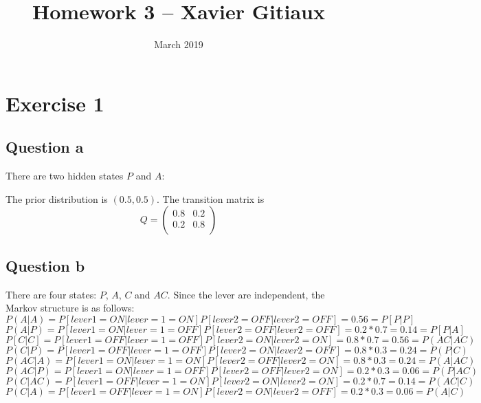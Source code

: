 \documentclass{article}
\title{Homework 3 -- Xavier Gitiaux}
\author{}
\date{March 2019}
\begin{document}
\maketitle

\section{Exercise 1}

\subsection{Question a}
There are two hidden states $P$ and $A$:

\begin{center}
\end{center}

The prior distribution is $(0.5, 0.5)$. The transition matrix is
\begin{equation}
Q= \begin{pmatrix}
0.8 & 0.2 \\
0.2 & 0.8 \\
\end{pmatrix}
\end{equation}

\subsection{Question b}
There are four states: $P$, $A$, $C$ and $AC$. Since the lever are independent, the Markov structure is as follows:
$$P(A|A) = P[lever 1= ON|lever=1=ON]P[lever 2=OFF|lever2 = OFF]=0.56 = P[P|P]$$
$$P(A|P)= P[lever 1= ON|lever=1=OFF]P[lever 2=OFF|lever2 = OFF]=0.2 * 0.7 =  0.14= P[P|A]$$
$$P[C|C] = P[lever 1= OFF|lever=1=OFF]P[lever 2=ON|lever2 = ON] = 0.8 * 0.7 = 0.56 = P(AC|AC)$$
$$P(C|P) = P[lever 1= OFF|lever=1=OFF]P[lever 2=ON|lever2 = OFF] = 0.8 * 0.3 = 0.24 = P(P|C)$$ 
$$P(AC|A) = P[lever 1= ON|lever=1=ON]P[lever 2=OFF|lever2 = ON] = 0.8 * 0.3 = 0.24 = P(A|AC)$$ 
$$P(AC|P) = P[lever 1= ON|lever=1=OFF]P[lever 2=OFF|lever2 = ON] = 0.2 * 0.3 = 0.06 = P(P|AC)$$ 
$$P(C|AC) = P[lever 1= OFF|lever=1=ON]P[lever 2=ON|lever2 = ON] = 0.2 * 0.7 = 0.14 = P(AC|C)$$ 
$$P(C|A) = P[lever 1= OFF|lever=1=ON]P[lever 2=ON|lever2 = OFF] = 0.2 * 0.3 = 0.06 = P(A|C)$$ 
\end{document}
